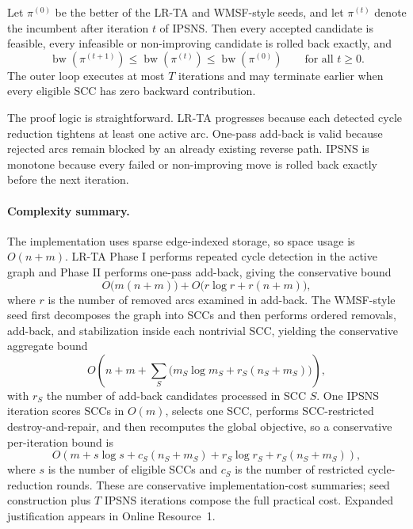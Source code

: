 \begin{proposition}
\label{prop:ipsns-monotonicity}
Let \(\pi^{(0)}\) be the better of the LR-TA and WMSF-style seeds, and let \(\pi^{(t)}\) denote the incumbent after iteration \(t\) of IPSNS. Then every accepted candidate is feasible, every infeasible or non-improving candidate is rolled back exactly, and
\begin{equation}
    \operatorname{bw}\!\left(\pi^{(t+1)}\right)\le \operatorname{bw}\!\left(\pi^{(t)}\right)\le \operatorname{bw}\!\left(\pi^{(0)}\right)
    \qquad \text{for all } t\ge 0.
    \label{eq:ipsns-monotonicity}
\end{equation}
The outer loop executes at most \(T\) iterations and may terminate earlier when every eligible SCC has zero backward contribution.
\end{proposition}

The proof logic is straightforward. LR-TA progresses because each detected cycle reduction tightens at least one active arc. One-pass add-back is valid because rejected arcs remain blocked by an already existing reverse path. IPSNS is monotone because every failed or non-improving move is rolled back exactly before the next iteration.

\paragraph{Complexity summary.}
The implementation uses sparse edge-indexed storage, so space usage is \(O(n+m)\). LR-TA Phase I performs repeated cycle detection in the active graph and Phase II performs one-pass add-back, giving the conservative bound
\begin{equation}
    O\!\big(m(n+m)\big) + O\!\big(r\log r + r(n+m)\big),
    \label{eq:lrta-complexity}
\end{equation}
where \(r\) is the number of removed arcs examined in add-back. The WMSF-style seed first decomposes the graph into SCCs and then performs ordered removals, add-back, and stabilization inside each nontrivial SCC, yielding the conservative aggregate bound
\begin{equation}
    O\!\left(n+m + \sum_{S}\big(m_S\log m_S + r_S(n_S+m_S)\big)\right),
    \label{eq:wmsf-complexity}
\end{equation}
with \(r_S\) the number of add-back candidates processed in SCC \(S\). One IPSNS iteration scores SCCs in \(O(m)\), selects one SCC, performs SCC-restricted destroy-and-repair, and then recomputes the global objective, so a conservative per-iteration bound is
\begin{equation}
    O\!\left(m + s\log s + c_S(n_S+m_S) + r_S\log r_S + r_S(n_S+m_S)\right),
    \label{eq:ipsns-iter-complexity}
\end{equation}
where \(s\) is the number of eligible SCCs and \(c_S\) is the number of restricted cycle-reduction rounds. These are conservative implementation-cost summaries; seed construction plus \(T\) IPSNS iterations compose the full practical cost. Expanded justification appears in Online Resource~1.
